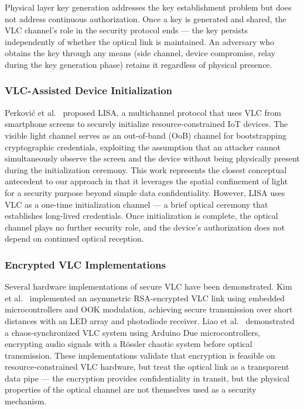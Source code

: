 \documentclass[conference]{IEEEtran}
\begin{document}
Physical layer key generation addresses the key establishment problem but does not address continuous authorization. Once a key is generated and shared, the VLC channel's role in the security protocol ends --- the key persists independently of whether the optical link is maintained. An adversary who obtains the key through any means (side channel, device compromise, relay during the key generation phase) retains it regardless of physical presence.

\subsubsection{VLC-Assisted Device Initialization}

Perkovi\'{c} et al.~\cite{lisa2019} proposed LISA, a multichannel protocol that uses VLC from smartphone screens to securely initialize resource-constrained IoT devices. The visible light channel serves as an out-of-band (OoB) channel for bootstrapping cryptographic credentials, exploiting the assumption that an attacker cannot simultaneously observe the screen and the device without being physically present during the initialization ceremony. This work represents the closest conceptual antecedent to our approach in that it leverages the spatial confinement of light for a security purpose beyond simple data confidentiality. However, LISA uses VLC as a one-time initialization channel --- a brief optical ceremony that establishes long-lived credentials. Once initialization is complete, the optical channel plays no further security role, and the device's authorization does not depend on continued optical reception.

\subsubsection{Encrypted VLC Implementations}

Several hardware implementations of secure VLC have been demonstrated. Kim et al.~\cite{kim2020} implemented an asymmetric RSA-encrypted VLC link using embedded microcontrollers and OOK modulation, achieving secure transmission over short distances with an LED array and photodiode receiver. Liao et al.~\cite{liao2021} demonstrated a chaos-synchronized VLC system using Arduino Due microcontrollers, encrypting audio signals with a R\"{o}ssler chaotic system before optical transmission. These implementations validate that encryption is feasible on resource-constrained VLC hardware, but treat the optical link as a transparent data pipe --- the encryption provides confidentiality in transit, but the physical properties of the optical channel are not themselves used as a security mechanism.
\end{document}
